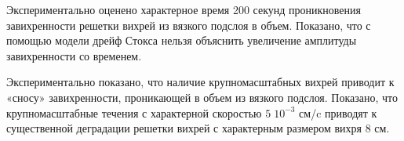 
Экспериментально оценено характерное время 200 секунд проникновения завихренности решетки вихрей из вязкого подслоя в объем. Показано, что с помощью модели дрейф Стокса нельзя объяснить увеличение амплитуды завихренности со временем.

Экспериментально показано, что наличие крупномасштабных вихрей приводит к «сносу» завихренности, проникающей в объем из вязкого подслоя. Показано, что крупномасштабные течения с характерной скоростью $5 \; 10^{-3}$ см/c приводят к существенной деградации решетки вихрей с характерным размером вихря 8 см.